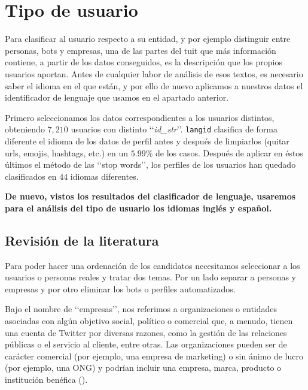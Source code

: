 \section{Tipo de usuario}
\label{sect:tipo_de_usuario}

Para clasificar al usuario respecto a su entidad, y por ejemplo distinguir entre personas, bots y empresas, 
una de las partes del tuit que más información contiene, a partir de los datos conseguidos, es
la descripción que los propios usuarios aportan. Antes de cualquier labor de análisis de esos textos,
es necesario saber el idioma en el que están, y por ello de nuevo aplicamos a nuestros datos 
el identificador de lenguaje que usamos en el apartado anterior. 

Primero seleccionamos los datos correspondientes a los usuarios distintos, obteniendo
$7,210$ usuarios con distinto \lq\lq{\em id\_str}\rq\rq. {\tt langid} clasifica de 
forma diferente el idioma de los datos de perfil antes y después de 
limpiarlos (quitar urls, emojis, hashtags, etc.) en un $5.99$\%
de los casos. Después de aplicar en éstos últimos el método de las \lq\lq stop words\rq\rq, 
los perfiles de los usuarios han quedado clasificados en $44$ idiomas diferentes.


{\bf De nuevo, vistos los resultados del clasificador de lenguaje, usaremos para el análisis del tipo 
de usuario los idiomas inglés y español.}

\subsection{Revisión de la literatura}

Para poder hacer una ordenación de los candidatos necesitamos seleccionar a los usuarios o personas 
reales y tratar dos temas. Por un lado separar a personas y empresas y por otro eliminar los bots 
o perfiles automatizados.

Bajo el nombre de \lq\lq empresas\rq\rq, nos referimos a organizaciones o entidades asociadas con algún objetivo social, político o comercial que, a menudo, tienen una cuenta de Twitter por diversas razones, como
la gestión de las relaciones públicas o el servicio al cliente, entre otras.
Las organizaciones pueden ser de carácter comercial (por ejemplo, una empresa de marketing) o 
sin ánimo de lucro (por ejemplo, una ONG) y podrían incluir una empresa, marca, producto o institución benéfica 
(\cite{user_class7}). 

